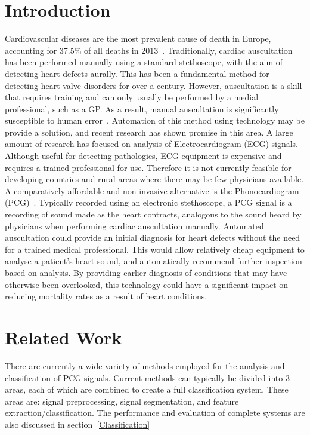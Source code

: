 \documentclass[titlepage, 12pt]{scrartcl} \usepackage{enumitem}
\begin{document}
\section{Introduction}
Cardiovascular diseases are the most prevalent cause of death in Europe,
accounting for 37.5\% of all deaths in 2013~\parencite{Eurostat2016}.
Traditionally, cardiac auscultation has been performed manually using a standard
stethoscope, with the aim of detecting heart defects aurally. This has been a
fundamental method for detecting heart valve disorders for over a century.
However, auscultation is a skill that requires training and can only usually be
performed by a medial professional, such as a GP. As a result, manual
auscultation is significantly susceptible to human error~\parencite{Hanna2002}.
Automation of this method using technology may be provide a solution, and
recent research has shown promise in this area. A large amount of research has
focused on analysis of Electrocardiogram (ECG) signals.  Although useful for
detecting pathologies, ECG equipment is expensive and requires a trained
professional for use. Therefore it is not currently feasible for developing
countries and rural areas where there may be few physicians available. A
comparatively affordable and non-invasive alternative is the Phonocardiogram
(PCG)~\parencite[p.130]{Reed2004}. Typically recorded using an electronic
stethoscope, a PCG signal is a recording of sound made as the heart contracts,
analogous to the sound heard by physicians when performing cardiac auscultation
manually. Automated auscultation could provide an initial diagnosis for heart
defects without the need for a trained medical professional. This would allow
relatively cheap equipment to analyse a patient's heart sound, and
automatically recommend further inspection based on analysis.  By providing
earlier diagnosis of conditions that may have otherwise been overlooked, this
technology could have a significant impact on reducing mortality rates as a
result of heart conditions.

\section{Related Work}
There are currently a wide variety of methods employed for the analysis and
classification of PCG signals. Current methods can typically be divided into 3
areas, each of which are combined to create a full classification system. These
areas are: signal preprocessing, signal segmentation, and feature
extraction/classification. The performance and evaluation of complete systems
are also discussed in section~\ref{Classification}
\end{document}
